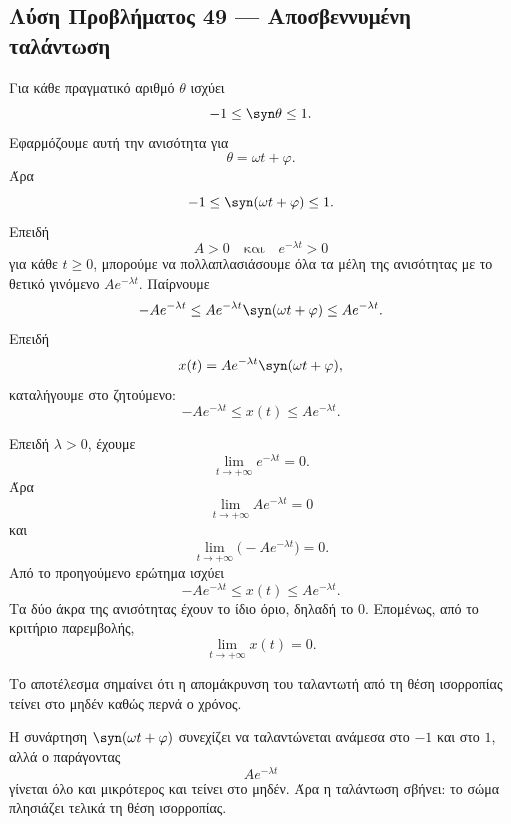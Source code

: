 \subsection*{Λύση Προβλήματος 49 --- Αποσβεννυμένη ταλάντωση}

\begin{alist}
  \item Για κάθε πραγματικό αριθμό $\theta$ ισχύει
        \[
          -1\leq \syn\theta\leq1.
        \]
        Εφαρμόζουμε αυτή την ανισότητα για
        \[
          \theta=\omega t+\varphi.
        \]
        Άρα
        \[
          -1\leq \syn(\omega t+\varphi)\leq1.
        \]
        Επειδή
        \[
          A>0
          \quad\text{και}\quad
          e^{-\lambda t}>0
        \]
        για κάθε $t\geq0$, μπορούμε να πολλαπλασιάσουμε όλα τα μέλη της
        ανισότητας με το θετικό γινόμενο \(Ae^{-\lambda t}\). Παίρνουμε
        \[
          -Ae^{-\lambda t}
          \leq
          Ae^{-\lambda t}\syn(\omega t+\varphi)
          \leq
          Ae^{-\lambda t}.
        \]
        Επειδή
        \[
          x(t)=Ae^{-\lambda t}\syn(\omega t+\varphi),
        \]
        καταλήγουμε στο ζητούμενο:
        \[
          {
          -Ae^{-\lambda t}\leq x(t)\leq Ae^{-\lambda t}
          }.
        \]

  \item Επειδή \(\lambda>0\), έχουμε
        \[
          \lim_{t\to+\infty}e^{-\lambda t}=0.
        \]
        Άρα
        \[
          \lim_{t\to+\infty}Ae^{-\lambda t}=0
        \]
        και
        \[
          \lim_{t\to+\infty}\bigl(-Ae^{-\lambda t}\bigr)=0.
        \]
        Από το προηγούμενο ερώτημα ισχύει
        \[
          -Ae^{-\lambda t}\leq x(t)\leq Ae^{-\lambda t}.
        \]
        Τα δύο άκρα της ανισότητας έχουν το ίδιο όριο, δηλαδή το $0$.
        Επομένως, από το κριτήριο παρεμβολής,
        \[
          {
          \lim_{t\to+\infty}x(t)=0
          }.
        \]

  \item Το αποτέλεσμα σημαίνει ότι η απομάκρυνση του ταλαντωτή από τη
        θέση ισορροπίας τείνει στο μηδέν καθώς περνά ο χρόνος.

        Η συνάρτηση \(\syn(\omega t+\varphi)\) συνεχίζει να ταλαντώνεται
        ανάμεσα στο \(-1\) και στο \(1\), αλλά ο παράγοντας
        \[
          Ae^{-\lambda t}
        \]
        γίνεται όλο και μικρότερος και τείνει στο μηδέν. Άρα η
        ταλάντωση σβήνει: το σώμα πλησιάζει τελικά τη θέση ισορροπίας.
\end{alist}
